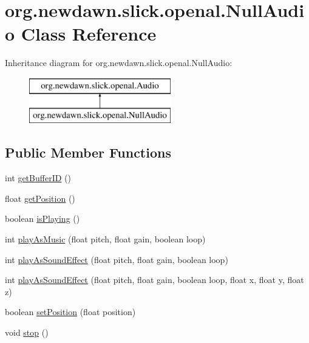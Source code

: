 \hypertarget{classorg_1_1newdawn_1_1slick_1_1openal_1_1_null_audio}{}\section{org.\+newdawn.\+slick.\+openal.\+Null\+Audio Class Reference}
\label{classorg_1_1newdawn_1_1slick_1_1openal_1_1_null_audio}
Inheritance diagram for org.\+newdawn.\+slick.\+openal.\+Null\+Audio\+:\begin{figure}[H]
\begin{center}
\leavevmode
\includegraphics[height=2.000000cm]{classorg_1_1newdawn_1_1slick_1_1openal_1_1_null_audio}
\end{center}
\end{figure}
\subsection*{Public Member Functions}
\begin{DoxyCompactItemize}
\item 
int \mbox{\hyperlink{classorg_1_1newdawn_1_1slick_1_1openal_1_1_null_audio_a1451cb508be59521271ab423ea0785a7}{get\+Buffer\+ID}} ()
\item 
float \mbox{\hyperlink{classorg_1_1newdawn_1_1slick_1_1openal_1_1_null_audio_a66050286dce4cedbeed88489d6bd5d5f}{get\+Position}} ()
\item 
boolean \mbox{\hyperlink{classorg_1_1newdawn_1_1slick_1_1openal_1_1_null_audio_a27365c7caedab2d146545ae5990a78c3}{is\+Playing}} ()
\item 
int \mbox{\hyperlink{classorg_1_1newdawn_1_1slick_1_1openal_1_1_null_audio_af43361f6993652cac2311408f18cf2d5}{play\+As\+Music}} (float pitch, float gain, boolean loop)
\item 
int \mbox{\hyperlink{classorg_1_1newdawn_1_1slick_1_1openal_1_1_null_audio_a0c990dbf98b062eb385f582b4798ed6e}{play\+As\+Sound\+Effect}} (float pitch, float gain, boolean loop)
\item 
int \mbox{\hyperlink{classorg_1_1newdawn_1_1slick_1_1openal_1_1_null_audio_a087fe22212fb03b4345f5d08f1e27dd5}{play\+As\+Sound\+Effect}} (float pitch, float gain, boolean loop, float x, float y, float z)
\item 
boolean \mbox{\hyperlink{classorg_1_1newdawn_1_1slick_1_1openal_1_1_null_audio_a833763970d1f01efe17bbc58bbb3ca59}{set\+Position}} (float position)
\item 
void \mbox{\hyperlink{classorg_1_1newdawn_1_1slick_1_1openal_1_1_null_audio_a8c13b73a507be7786c06397c8b0175f0}{stop}} ()
\end{DoxyCompactItemize}


